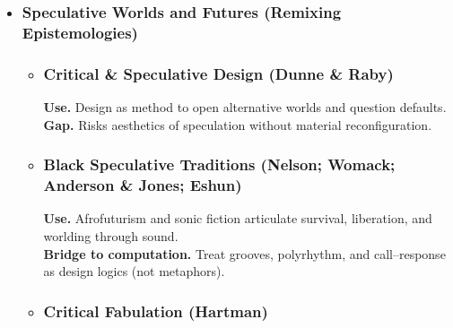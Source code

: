 \begin{itemize}[nosep]
\begin{itemize}[nosep]
		\item \subsubsection{Platform/Material Studies (Montfort \& Bogost; Terranova; Malazita)}
			\textbf{Core claim.} Platforms and media ecologies encode assumptions; infrastructures shape possible practices. \\
			\textbf{Implication for ST.} Read audio stacks (plugins, engines, controllers) as sites where defaults can be strategically re-authored.
		\item \subsubsection{Synthesis} Mediation is culturally specific; the audio apparatus/platform encodes it. ST targets those encodings.
	\end{itemize}
	\item \subsubsection{Speculative Worlds and Futures (Remixing Epistemologies)}
	\begin{itemize}[nosep]
		\item \subsubsection{Critical \& Speculative Design (Dunne \& Raby)}
		\textbf{Use.} Design as method to open alternative worlds and question defaults. \\
		\textbf{Gap.} Risks aesthetics of speculation without material reconfiguration.
		\item \subsubsection{Black Speculative Traditions (Nelson; Womack; Anderson \& Jones; Eshun)}
		\textbf{Use.} Afrofuturism and sonic fiction articulate survival, liberation, and worlding through sound. \\
		\textbf{Bridge to computation.} Treat grooves, polyrhythm, and call–response as design logics (not metaphors).
		\item \subsubsection{Critical Fabulation (Hartman)}

\end{itemize}
\end{itemize}

